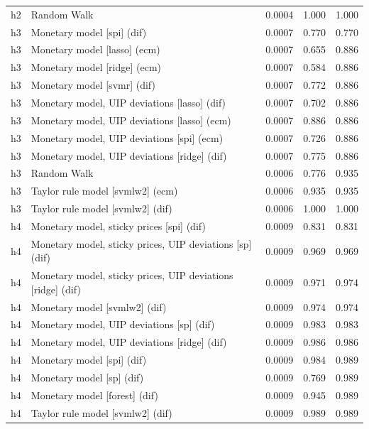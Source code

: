 \begin{ThreePartTable}
\begin{longtable}[t]{cp{5.5cm}ccc}
h2 & \raggedright Random Walk & 0.0004 & 1.000 & 1.000\\
\addlinespace
h3 & \raggedright Monetary model [spi] (dif) & 0.0007 & 0.770 & 0.770\\
h3 & \raggedright Monetary model [lasso] (ecm) & 0.0007 & 0.655 & 0.886\\
h3 & \raggedright Monetary model [ridge] (ecm) & 0.0007 & 0.584 & 0.886\\
h3 & \raggedright Monetary model [svmr] (dif) & 0.0007 & 0.772 & 0.886\\
h3 & \raggedright Monetary model, UIP deviations [lasso] (dif) & 0.0007 & 0.702 & 0.886\\
h3 & \raggedright Monetary model, UIP deviations [lasso] (ecm) & 0.0007 & 0.886 & 0.886\\
h3 & \raggedright Monetary model, UIP deviations [spi] (ecm) & 0.0007 & 0.726 & 0.886\\
h3 & \raggedright Monetary model, UIP deviations [ridge] (dif) & 0.0007 & 0.775 & 0.886\\
h3 & \raggedright Random Walk & 0.0006 & 0.776 & 0.935\\
h3 & \raggedright Taylor rule model [svmlw2] (ecm) & 0.0006 & 0.935 & 0.935\\
h3 & \raggedright Taylor rule model [svmlw2] (dif) & 0.0006 & 1.000 & 1.000\\
\addlinespace
h4 & \raggedright Monetary model, sticky prices [spi] (dif) & 0.0009 & 0.831 & 0.831\\
h4 & \raggedright Monetary model, sticky prices, UIP deviations [sp] (dif) & 0.0009 & 0.969 & 0.969\\
h4 & \raggedright Monetary model, sticky prices, UIP deviations [ridge] (dif) & 0.0009 & 0.971 & 0.974\\
h4 & \raggedright Monetary model [svmlw2] (dif) & 0.0009 & 0.974 & 0.974\\
h4 & \raggedright Monetary model, UIP deviations [sp] (dif) & 0.0009 & 0.983 & 0.983\\
h4 & \raggedright Monetary model, UIP deviations [ridge] (dif) & 0.0009 & 0.986 & 0.986\\
h4 & \raggedright Monetary model [spi] (dif) & 0.0009 & 0.984 & 0.989\\
h4 & \raggedright Monetary model [sp] (dif) & 0.0009 & 0.769 & 0.989\\
h4 & \raggedright Monetary model [forest] (dif) & 0.0009 & 0.945 & 0.989\\
h4 & \raggedright Taylor rule model [svmlw2] (dif) & 0.0009 & 0.989 & 0.989\\

\end{longtable}
\end{ThreePartTable}
